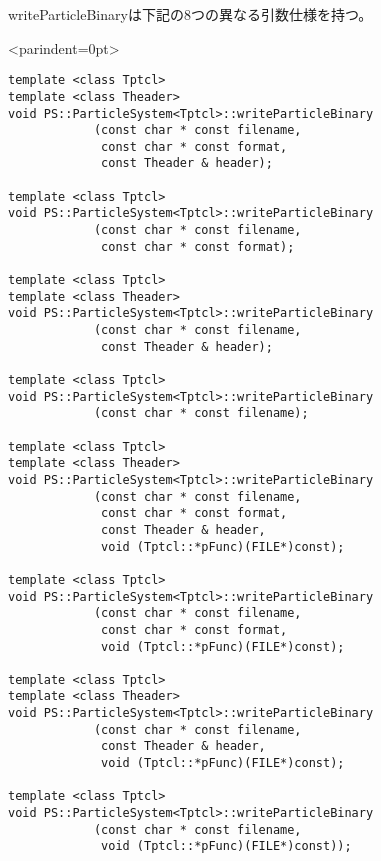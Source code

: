 writeParticleBinaryは下記の8つの異なる引数仕様を持つ。
\begin{breakitembox}<parindent=0pt>{}
\begin{verbatim}
template <class Tptcl>
template <class Theader>
void PS::ParticleSystem<Tptcl>::writeParticleBinary
            (const char * const filename,
             const char * const format,
             const Theader & header);
             
template <class Tptcl>
void PS::ParticleSystem<Tptcl>::writeParticleBinary
            (const char * const filename,
             const char * const format);

template <class Tptcl>
template <class Theader>
void PS::ParticleSystem<Tptcl>::writeParticleBinary
            (const char * const filename,
             const Theader & header);

template <class Tptcl>
void PS::ParticleSystem<Tptcl>::writeParticleBinary
            (const char * const filename);

template <class Tptcl>
template <class Theader>
void PS::ParticleSystem<Tptcl>::writeParticleBinary
            (const char * const filename,
             const char * const format,
             const Theader & header,
             void (Tptcl::*pFunc)(FILE*)const);

template <class Tptcl>
void PS::ParticleSystem<Tptcl>::writeParticleBinary
            (const char * const filename,
             const char * const format,
             void (Tptcl::*pFunc)(FILE*)const);

template <class Tptcl>
template <class Theader>
void PS::ParticleSystem<Tptcl>::writeParticleBinary
            (const char * const filename,
             const Theader & header,
             void (Tptcl::*pFunc)(FILE*)const);

template <class Tptcl>             
void PS::ParticleSystem<Tptcl>::writeParticleBinary
            (const char * const filename,
             void (Tptcl::*pFunc)(FILE*)const));
\end{verbatim}
\end{breakitembox}

